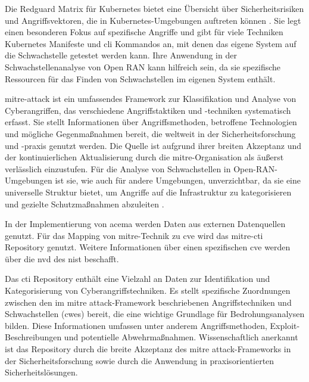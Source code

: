\par Die Redguard Matrix für Kubernetes bietet eine Übersicht über Sicherheitsrisiken und Angriffsvektoren, die in Kubernetes-Umgebungen auftreten können \autocite{KubernetesThreatMatrix}. Sie legt einen besonderen Fokus auf spezifische Angriffe und gibt für viele Techniken Kubernetes Manifeste und \gls{cli} Kommandos an, mit denen das eigene System auf die Schwachstelle getestet werden kann. Ihre Anwendung in der Schwachstellenanalyse von Open RAN kann hilfreich sein, da sie spezifische Ressourcen für das Finden von Schwachstellen im eigenen System enthält.

\par \gls{mitre}-\gls{attack} ist ein umfassendes Framework zur Klassifikation und Analyse von Cyberangriffen, das verschiedene Angriffstaktiken und -techniken systematisch erfasst. Sie stellt Informationen über Angriffsmethoden, betroffene Technologien und mögliche Gegenmaßnahmen bereit, die weltweit in der Sicherheitsforschung und -praxis genutzt werden. Die Quelle ist aufgrund ihrer breiten Akzeptanz und der kontinuierlichen Aktualisierung durch die \gls{mitre}-Organisation als äußerst verlässlich einzustufen. Für die Analyse von Schwachstellen in Open-RAN-Umgebungen ist sie, wie auch für andere Umgebungen, unverzichtbar, da sie eine universelle Struktur bietet, um Angriffe auf die Infrastruktur zu kategorisieren und gezielte Schutzmaßnahmen abzuleiten \autocite{MITREATTCK}.
%
\par In der Implementierung von \gls{acema} werden Daten aus externen Datenquellen genutzt. Für das Mapping von \gls{mitre}-Technik zu \gls{cve} wird das \gls{mitre}-\gls{cti} Repository genutzt. Weitere Informationen über einen spezifischen \gls{cve} werden über die \gls{nvd} des \gls{nist} beschafft.
\par Das \gls{cti} Repository enthält eine Vielzahl an Daten zur Identifikation und Kategorisierung von Cyberangriffstechniken. Es stellt spezifische Zuordnungen zwischen den im \gls{mitre} \gls{attack}-Framework beschriebenen Angriffstechniken und Schwachstellen (\glspl{cwe}) bereit, die eine wichtige Grundlage für Bedrohungsanalysen bilden. Diese Informationen umfassen unter anderem Angriffsmethoden, Exploit-Beschreibungen und potentielle Abwehrmaßnahmen. Wissenschaftlich anerkannt ist das Repository durch die breite Akzeptanz des \gls{mitre} \gls{attack}-Frameworks in der Sicherheitsforschung sowie durch die Anwendung in praxisorientierten Sicherheitslösungen.
